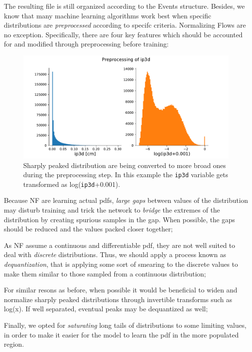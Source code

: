 The resulting file is still organized according to the Events structure. Besides, we know that many machine learning algorithms work best when specific distributions are \emph{preprocessed} according to specifc criteria. Normalizing Flows are no exception. Specifically, there are four key features which should be accounted for and modified through preprocessing before training:

\begin{figure}
    \centering
    \includegraphics[width=\columnwidth]{gfx/ch5/preproce.pdf}
    \caption[Preprocessing]{Sharply peaked distribution are being converted to more broad ones during the preprocessing step. In this example the \texttt{ip3d} variable gets transformed as log(\texttt{ip3d}+0.001).}
    \label{fig:preproce}
\end{figure}

\begin{outline}
\1 Because NF are learning actual pdfs, \emph{large gaps} between values of the distribution may disturb training and trick the network to \emph{bridge} the extremes of the distribution by creating spurious samples in the gap. When possible, the gaps should be reduced and the values packed closer together;

\1 As NF assume a continuous and differentiable pdf, they are not well suited to deal with \emph{discrete} distributions. Thus, we should apply a process known as \emph{dequantization}, that is applying some sort of smearing to the discrete values to make them similar to those sampled from a continuous distribution;

\1 For similar resons as before, when possible it would be beneficial to widen and normalize sharply peaked distributions through invertible transforms such as log(x). If well separated, eventual peaks may be dequantized as well;

\1 Finally, we opted for \emph{saturating} long tails of distributions to some limiting values, in order to make it easier for the model to learn the pdf in the more populated region.
\end{outline}

